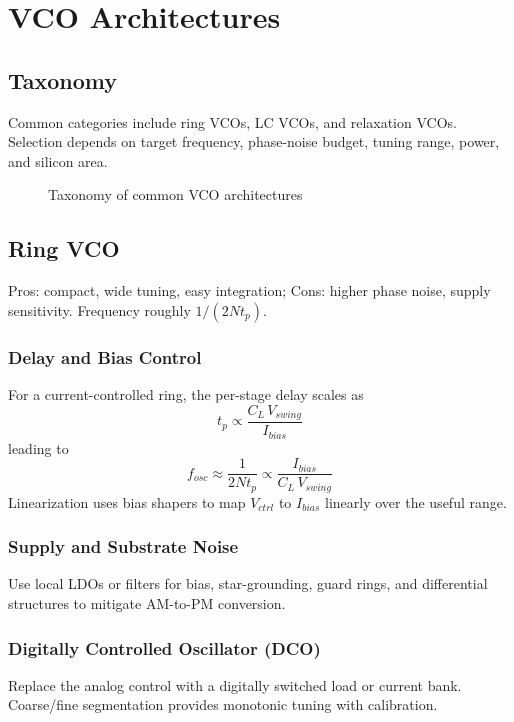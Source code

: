 \chapter{VCO Architectures}
\section{Taxonomy}
Common categories include ring VCOs, LC VCOs, and relaxation VCOs. Selection depends on target frequency, phase-noise budget, tuning range, power, and silicon area.
\begin{figure}[H]
  \centering
  \caption{Taxonomy of common VCO architectures}
\end{figure}
\section{Ring VCO}
Pros: compact, wide tuning, easy integration; Cons: higher phase noise, supply sensitivity. Frequency roughly \(1/(2Nt_p)\).
\subsection*{Delay and Bias Control}
For a current-controlled ring, the per-stage delay scales as
\[
 t_p \propto \frac{C_L\,V_{swing}}{I_{bias}}
\]
leading to
\[
 f_{osc} \approx \frac{1}{2 N t_p} \propto \frac{I_{bias}}{C_L\,V_{swing}}
\]
Linearization uses bias shapers to map \(V_{ctrl}\) to \(I_{bias}\) linearly over the useful range.
\subsection*{Supply and Substrate Noise}
Use local LDOs or filters for bias, star-grounding, guard rings, and differential structures to mitigate AM-to-PM conversion.
\subsection*{Digitally Controlled Oscillator (DCO)}
Replace the analog control with a digitally switched load or current bank. Coarse/fine segmentation provides monotonic tuning with calibration.
